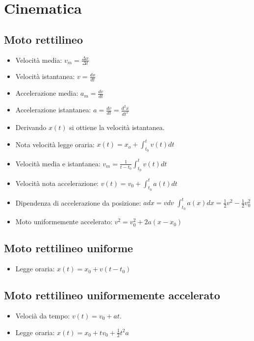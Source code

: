 \section{Cinematica}

	\subsection{Moto rettilineo}
	\begin{itemize}
		\item Velocit\`a media: $v_m = \frac{\Delta x}{\Delta t}$
		\item Velocit\`a istantanea: $v = \frac{dx}{dt}$
		\item Accelerazione media: $a_m = \frac{dv}{dt}$
		\item Accelerazione istantanea: $a = \frac{dv}{dt}=\frac{d^2x}{dt^2}$
		\item Derivando $x(t)$ si ottiene la velocit\`a istantanea.
		\item Nota velocit\`a legge oraria: $x(t) = x_o + \int_{t_0}^{t}v(t)dt$
		\item Velocit\`a media e istantanea: $v_m = \frac{1}{t-t_0}\int_{t_0}^t v(t)dt$
		\item Velocit\`a nota accelerazione: $v(t) = v_0+\int_{t_0}^t a(t)dt$
		\item Dipendenza di accelerazione da posizione: $adx =vdv$ $\int_{t_0}^t a(x)dx = \frac{1}{2}v^2-\frac{1}{2}v_0^2$
		\item Moto uniformemente accelerato: $v^2 = v_0^2 + 2a(x-x_0)$
	\end{itemize}
	\subsection{Moto rettilineo uniforme}
	\begin{itemize}
		\item Legge oraria: $x(t) = x_0 + v(t-t_0)$
	\end{itemize}
	\subsection{Moto rettilineo uniformemente accelerato}
	\begin{itemize}
		\item Veloci\`a da tempo: $v(t) = v_0+at$.
		\item Legge oraria: $x(t) = x_0 + tv_0 + \frac{1}{2}t^2a$
	\end{itemize}
